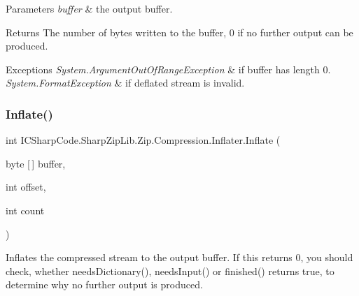 \begin{DoxyParams}{Parameters}
{\em buffer} & the output buffer. \\
\hline
\end{DoxyParams}
\begin{DoxyReturn}{Returns}
The number of bytes written to the buffer, 0 if no further output can be produced. 
\end{DoxyReturn}

\begin{DoxyExceptions}{Exceptions}
{\em System.\+Argument\+Out\+Of\+Range\+Exception} & if buffer has length 0. \\
\hline
{\em System.\+Format\+Exception} & if deflated stream is invalid. \\
\hline
\end{DoxyExceptions}
\mbox{\label{class_i_c_sharp_code_1_1_sharp_zip_lib_1_1_zip_1_1_compression_1_1_inflater_aa77071f9ea123757cf11bae7b0fc4ea9}} 
\subsubsection{\texorpdfstring{Inflate()}{Inflate()}\hspace{0.1cm}{\footnotesize\ttfamily [4/4]}}
{\footnotesize\ttfamily int I\+C\+Sharp\+Code.\+Sharp\+Zip\+Lib.\+Zip.\+Compression.\+Inflater.\+Inflate (\begin{DoxyParamCaption}\item[{byte \mbox{[}$\,$\mbox{]}}]{buffer,  }\item[{int}]{offset,  }\item[{int}]{count }\end{DoxyParamCaption})\hspace{0.3cm}{\ttfamily [inline]}}



Inflates the compressed stream to the output buffer. If this returns 0, you should check, whether needs\+Dictionary(), needs\+Input() or finished() returns true, to determine why no further output is produced. 


